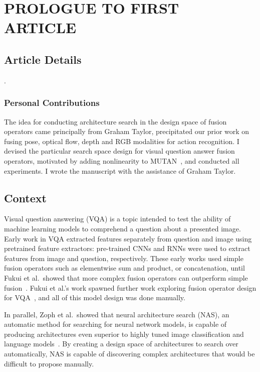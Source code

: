 \chapter{PROLOGUE TO FIRST ARTICLE}


\section{Article Details}

.

\subsection{Personal Contributions}

The idea for conducting architecture search in the design space of fusion
operators came principally from Graham Taylor, precipitated our prior work on
fusing pose, optical flow, depth and RGB modalities for action recognition.
I devised the particular search space design for visual question answer fusion
operators, motivated by adding nonlinearity to MUTAN~\cite{ben2017mutan}, and
conducted all experiments.
I wrote the manuscript with the assistance of Graham Taylor.


\section{Context}

Visual question answering (VQA) is a topic intended to test the ability of
machine learning models to comprehend a question about a presented image.
Early work in VQA extracted features separately from question and image using
pretrained feature extractors: pre-trained CNNs and RNNs were used to extract
features from image and question, respectively.
These early works used simple fusion operators such as elementwise sum and
product, or concatenation, until Fukui et al.\ showed that more complex fusion
operators can outperform simple fusion~\cite{fukui2016multimodalCB}.
Fukui et al.'s work spawned further work exploring fusion operator design for
VQA~\cite{Kim2017, ben2017mutan}, and all of this model design was done
manually.

In parallel, Zoph et al.\ showed that neural architecture
search (NAS), an automatic method for searching for neural network models, is
capable of producing architectures even superior to highly tuned image
classification and language models~\cite{zoph2016neural}.
By creating a design space of architectures to search over automatically, NAS
is capable of discovering complex architectures that would be difficult to
propose manually.

